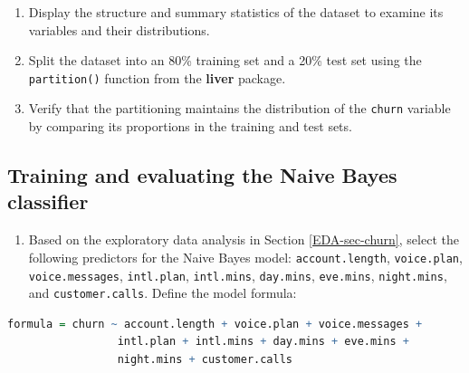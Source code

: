 \documentclass[
]{book}
\newcommand{\passthrough}[1]{#1}
\providecommand{\tightlist}{%
  \setlength{\itemsep}{0pt}\setlength{\parskip}{0pt}}
\theoremstyle{definition}
\theoremstyle{definition}
\theoremstyle{definition}
\theoremstyle{definition}
\theoremstyle{remark}
\begin{document}
\begin{enumerate}
\def\labelenumi{\arabic{enumi}.}
\setcounter{enumi}{17}
\item
  Display the structure and summary statistics of the dataset to examine its variables and their distributions.
\item
  Split the dataset into an 80\% training set and a 20\% test set using the \passthrough{\lstinline!partition()!} function from the \textbf{liver} package.
\item
  Verify that the partitioning maintains the distribution of the \passthrough{\lstinline!churn!} variable by comparing its proportions in the training and test sets.
\end{enumerate}

\subsection*{Training and evaluating the Naive Bayes classifier}\label{training-and-evaluating-the-naive-bayes-classifier}

\begin{enumerate}
\def\labelenumi{\arabic{enumi}.}
\setcounter{enumi}{20}
\tightlist
\item
  Based on the exploratory data analysis in Section \ref{EDA-sec-churn}, select the following predictors for the Naive Bayes model: \passthrough{\lstinline!account.length!}, \passthrough{\lstinline!voice.plan!}, \passthrough{\lstinline!voice.messages!}, \passthrough{\lstinline!intl.plan!}, \passthrough{\lstinline!intl.mins!}, \passthrough{\lstinline!day.mins!}, \passthrough{\lstinline!eve.mins!}, \passthrough{\lstinline!night.mins!}, and \passthrough{\lstinline!customer.calls!}. Define the model formula:
\end{enumerate}

\begin{lstlisting}[language=R]
formula = churn ~ account.length + voice.plan + voice.messages + 
                 intl.plan + intl.mins + day.mins + eve.mins + 
                 night.mins + customer.calls
\end{lstlisting}
\end{document}
